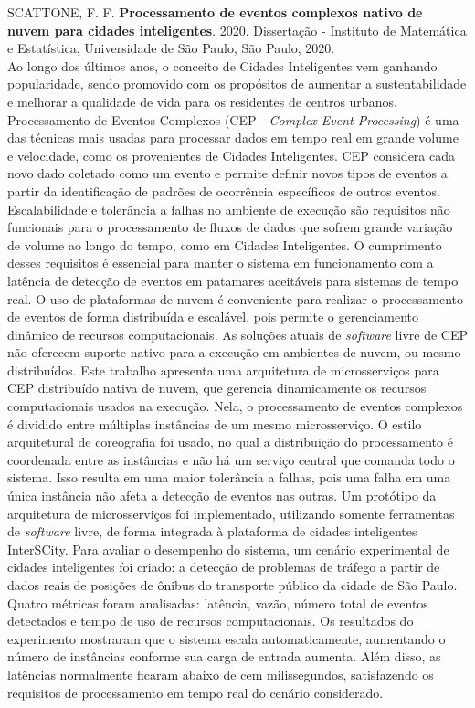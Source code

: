 \documentclass[11pt,twoside,a4paper]{book}
\begin{document}
\noindent SCATTONE, F. F. \textbf{Processamento de eventos complexos nativo de nuvem para cidades inteligentes}. 2020. Dissertação %
- Instituto de Matemática e Estatística, Universidade de São Paulo, São Paulo, 2020.\\
Ao longo dos últimos anos, o conceito de Cidades Inteligentes vem ganhando popularidade, sendo promovido com os propósitos de aumentar a sustentabilidade e melhorar a qualidade de vida para os residentes de centros urbanos. Processamento de Eventos Complexos (CEP - \emph{Complex Event Processing}) é uma das técnicas mais usadas para processar dados em tempo real em grande volume e velocidade, como os provenientes de Cidades Inteligentes. CEP considera cada novo dado coletado como um evento e permite definir novos tipos de eventos a partir da identificação de padrões de ocorrência específicos de outros eventos. Escalabilidade e tolerância a falhas no ambiente de execução são requisitos não funcionais para o processamento de fluxos de dados que sofrem grande variação de volume ao longo do tempo, como em Cidades Inteligentes. O cumprimento desses requisitos é essencial para manter o sistema em funcionamento com a latência de detecção de eventos em patamares aceitáveis para sistemas de tempo real. O uso de plataformas de nuvem é conveniente para realizar o processamento de eventos de forma distribuída e escalável, pois permite o gerenciamento dinâmico de recursos computacionais. 
As soluções atuais de \textit{software} livre de CEP não oferecem suporte nativo para a execução em ambientes de nuvem, ou mesmo distribuídos.
Este trabalho apresenta uma arquitetura de microsserviços para CEP distribuído nativa de nuvem, que gerencia dinamicamente os recursos computacionais usados na execução. Nela, o processamento de eventos complexos é dividido entre múltiplas instâncias de um mesmo microsserviço. O estilo arquitetural de coreografia foi usado, no qual a distribuição do processamento é coordenada entre as instâncias e não há um serviço central que comanda todo o sistema. Isso resulta em uma maior tolerância a falhas, pois uma falha em uma única instância não afeta a detecção de eventos nas outras. Um protótipo da arquitetura de microsserviços foi implementado, utilizando somente ferramentas de \textit{software} livre, de forma integrada à plataforma de cidades inteligentes InterSCity. Para avaliar o desempenho do sistema, um cenário experimental de cidades inteligentes foi criado: a detecção de problemas de tráfego a partir de dados reais de posições de ônibus do transporte público da cidade de São Paulo. Quatro métricas foram analisadas: latência, vazão, número total de eventos detectados e tempo de uso de recursos computacionais. Os resultados do experimento mostraram que o sistema escala automaticamente, aumentando o número de instâncias conforme sua carga de entrada aumenta. 
Além disso, as latências normalmente ficaram abaixo de
cem milissegundos, satisfazendo os requisitos de processamento em tempo real do cenário considerado.\\
\end{document}
